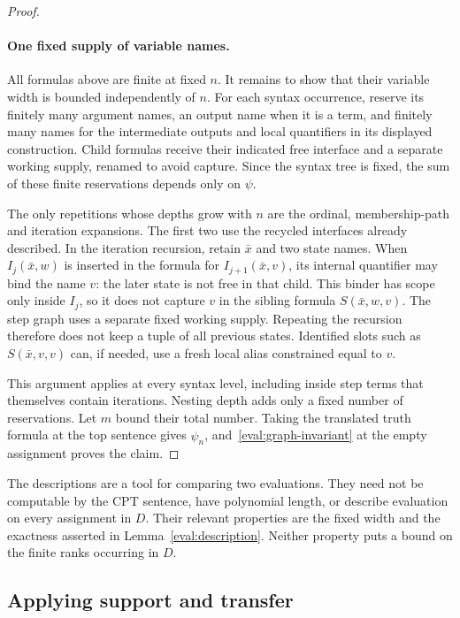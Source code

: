 \begin{proof}
\paragraph{One fixed supply of variable names.}
All formulas above are finite at fixed \(n\).  It remains to show that
their variable width is bounded independently of \(n\).
For each syntax occurrence, reserve its finitely many argument names,
an output name when it is a term, and finitely many names for the
intermediate outputs and local quantifiers in its displayed construction.
Child formulas receive their indicated free interface and a separate
working supply, renamed to avoid capture.  Since the syntax tree is
fixed, the sum of these finite reservations depends only on \(\psi\).

The only repetitions whose depths grow with \(n\) are the ordinal,
membership-path and iteration expansions.  The first two use the
recycled interfaces already described.  In the iteration recursion,
retain \(\bar x\) and two state names.  When \(I_j(\bar x,w)\) is inserted
in the formula for \(I_{j+1}(\bar x,v)\), its internal quantifier may bind
the name \(v\): the later state is not free in that child.  This binder
has scope only inside \(I_j\), so it does not capture \(v\) in the
sibling formula \(S(\bar x,w,v)\).  The step graph uses a separate fixed
working supply.  Repeating the recursion therefore does not keep a
tuple of all previous states.  Identified slots such as
\(S(\bar x,v,v)\) can, if needed, use a fresh local alias constrained
equal to \(v\).

This argument applies at every syntax level, including inside step
terms that themselves contain iterations.  Nesting depth adds only a
fixed number of reservations.  Let \(m\) bound their total number.
Taking the translated truth formula at the top sentence gives
\(\widehat\psi_n\), and~\eqref{eval:graph-invariant} at the empty
assignment proves the claim.
\end{proof}

The descriptions are a tool for comparing two evaluations.  They need
not be computable by the CPT sentence, have polynomial length, or
describe evaluation on every assignment in \(D\).  Their relevant
properties are the fixed width and the exactness asserted in
Lemma~\ref{eval:description}.  Neither property puts a bound on the
finite ranks occurring in \(D\).

\subsection{Applying support and transfer}

